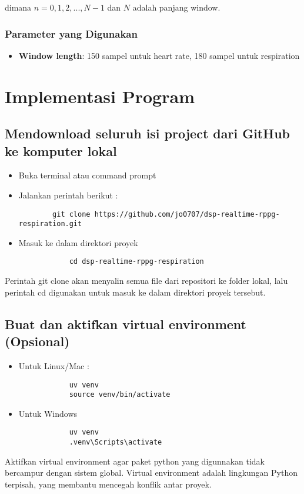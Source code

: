\documentclass[11pt,a4paper]{article}
\begin{document}
dimana $n = 0, 1, 2, ..., N-1$ dan $N$ adalah panjang window.

\subsubsection{Parameter yang Digunakan}
\begin{itemize}
    \item \textbf{Window length}: 150 sampel untuk heart rate, 180 sampel untuk respiration
\end{itemize}


\section{Implementasi Program}

\subsection{Mendownload seluruh isi project dari GitHub ke komputer lokal}
    \begin{itemize}
        \item Buka terminal atau command prompt
        \item Jalankan perintah berikut : 
        \begin{lstlisting}
        git clone https://github.com/jo0707/dsp-realtime-rppg-respiration.git\end{lstlisting}
        \item Masuk ke dalam direktori proyek 
        \begin{lstlisting}
            cd dsp-realtime-rppg-respiration\end{lstlisting}
    \end{itemize}
    Perintah git clone akan menyalin semua file dari repositori ke folder lokal, lalu perintah cd digunakan untuk masuk ke dalam direktori proyek tersebut.

\subsection{Buat dan aktifkan virtual environment (Opsional)}
    \begin{itemize}
        \item Untuk Linux/Mac : 
        \begin{lstlisting}
            uv venv
            source venv/bin/activate\end{lstlisting}
        \item Untuk Windows
        \begin{lstlisting}
            uv venv
            .venv\Scripts\activate\end{lstlisting}\end{itemize}
    Aktifkan virtual environment agar paket python yang digunnakan tidak bercampur dengan sistem global. Virtual environment adalah lingkungan Python terpisah, yang membantu mencegah konflik antar proyek.
    
\end{document}
